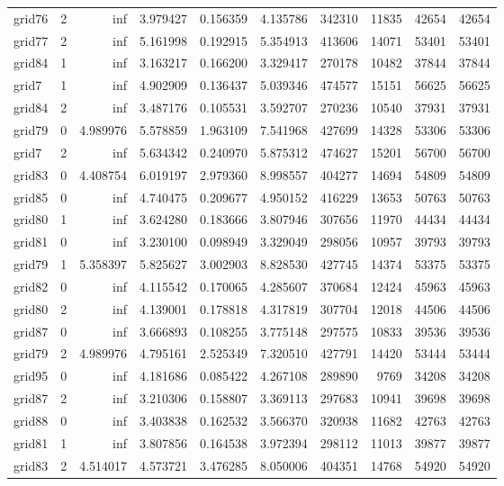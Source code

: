 \begin{longtable}{|l|r|r|r|r|r|r|r|r|r|}
grid76 & 2 & inf & 3.979427 & 0.156359 & 4.135786 & 342310 & 11835 & 42654 & 42654 \\
grid77 & 2 & inf & 5.161998 & 0.192915 & 5.354913 & 413606 & 14071 & 53401 & 53401 \\
grid84 & 1 & inf & 3.163217 & 0.166200 & 3.329417 & 270178 & 10482 & 37844 & 37844 \\
grid7 & 1 & inf & 4.902909 & 0.136437 & 5.039346 & 474577 & 15151 & 56625 & 56625 \\
grid84 & 2 & inf & 3.487176 & 0.105531 & 3.592707 & 270236 & 10540 & 37931 & 37931 \\
grid79 & 0 & 4.989976 & 5.578859 & 1.963109 & 7.541968 & 427699 & 14328 & 53306 & 53306 \\
grid7 & 2 & inf & 5.634342 & 0.240970 & 5.875312 & 474627 & 15201 & 56700 & 56700 \\
grid83 & 0 & 4.408754 & 6.019197 & 2.979360 & 8.998557 & 404277 & 14694 & 54809 & 54809 \\
grid85 & 0 & inf & 4.740475 & 0.209677 & 4.950152 & 416229 & 13653 & 50763 & 50763 \\
grid80 & 1 & inf & 3.624280 & 0.183666 & 3.807946 & 307656 & 11970 & 44434 & 44434 \\
grid81 & 0 & inf & 3.230100 & 0.098949 & 3.329049 & 298056 & 10957 & 39793 & 39793 \\
grid79 & 1 & 5.358397 & 5.825627 & 3.002903 & 8.828530 & 427745 & 14374 & 53375 & 53375 \\
grid82 & 0 & inf & 4.115542 & 0.170065 & 4.285607 & 370684 & 12424 & 45963 & 45963 \\
grid80 & 2 & inf & 4.139001 & 0.178818 & 4.317819 & 307704 & 12018 & 44506 & 44506 \\
grid87 & 0 & inf & 3.666893 & 0.108255 & 3.775148 & 297575 & 10833 & 39536 & 39536 \\
grid79 & 2 & 4.989976 & 4.795161 & 2.525349 & 7.320510 & 427791 & 14420 & 53444 & 53444 \\
grid95 & 0 & inf & 4.181686 & 0.085422 & 4.267108 & 289890 & 9769 & 34208 & 34208 \\
grid87 & 2 & inf & 3.210306 & 0.158807 & 3.369113 & 297683 & 10941 & 39698 & 39698 \\
grid88 & 0 & inf & 3.403838 & 0.162532 & 3.566370 & 320938 & 11682 & 42763 & 42763 \\
grid81 & 1 & inf & 3.807856 & 0.164538 & 3.972394 & 298112 & 11013 & 39877 & 39877 \\
grid83 & 2 & 4.514017 & 4.573721 & 3.476285 & 8.050006 & 404351 & 14768 & 54920 & 54920 \\

\end{longtable}
